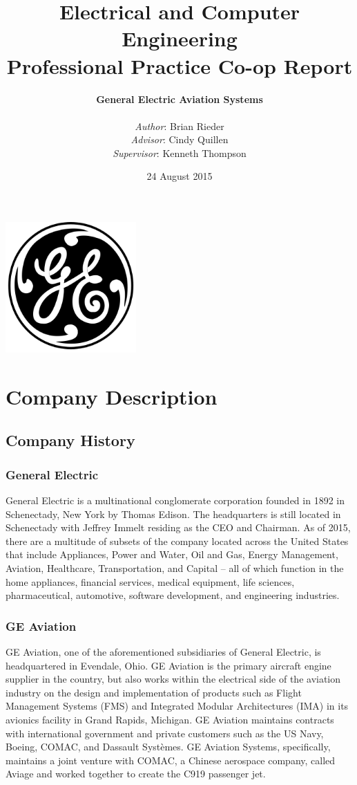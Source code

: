 \documentclass{article}
\title{Electrical and Computer Engineering \\ 
Professional Practice Co-op Report
}
\author{
\textbf{General Electric Aviation Systems} \\
\\
\textit{Author}:     Brian Rieder\\
\textit{Advisor}:    Cindy Quillen\\
\textit{Supervisor}: Kenneth Thompson
}
\date{24 August 2015}
\begin{document}
\maketitle
\begin{center}
  \includegraphics[width=5cm,height=5cm,keepaspectratio]{General_Electric_1930.png}
\end{center}
\newpage

\tableofcontents
{}
\newpage


\section{Company Description}
\subsection{Company History}
\subsubsection{General Electric}
General Electric is a multinational conglomerate corporation founded in 1892 in Schenectady, New York by Thomas Edison. The headquarters is still located in Schenectady with Jeffrey Immelt residing as the CEO and Chairman. 
As of 2015, there are a multitude of subsets of the company located across the United States that include Appliances, Power and Water, Oil and Gas, Energy Management, Aviation, Healthcare, Transportation, and Capital -- all of which function in the home appliances, financial services, medical equipment, life sciences, pharmaceutical, automotive, software development, and engineering industries.
\subsubsection{GE Aviation}
GE Aviation, one of the aforementioned subsidiaries of General Electric, is headquartered in Evendale, Ohio. GE Aviation is the primary aircraft engine supplier in the country, but also works within the electrical side of the aviation industry on the design and implementation of products such as Flight Management Systems (FMS) and Integrated Modular Architectures (IMA) in its avionics facility in Grand Rapids, Michigan. 
GE Aviation maintains contracts with international government and private customers such as the US Navy, Boeing, COMAC, and Dassault Systèmes. 
GE Aviation Systems, specifically, maintains a joint venture with COMAC, a Chinese aerospace company, called Aviage and worked together to create the C919 passenger jet.
\end{document}
